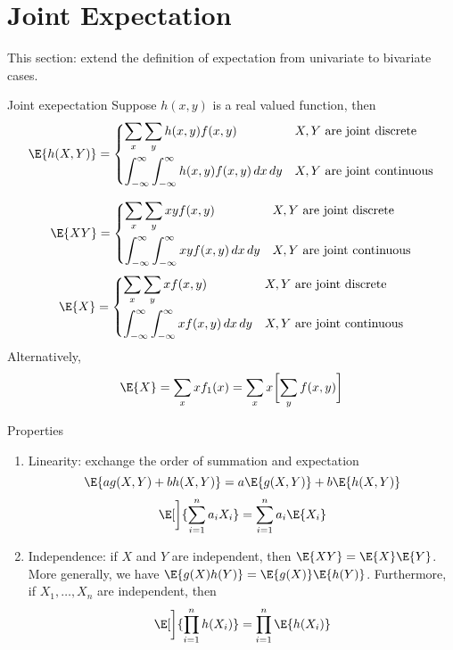 \section{Joint Expectation}
This section: extend the definition of expectation
from univariate to bivariate cases.
\begin{Definition}{Joint exepectation}{}
    Suppose $ h(x,y) $ is a real valued function, then
    \[ \E{h(X,Y)}=\begin{dcases}
            \sum_{x}\sum_{y}h(x,y)f(x,y) & X,Y\text{ are joint discrete}   \\
            \int_{-\infty}^{\infty} \int_{-\infty}^{\infty} h(x,y)f(x,y)\, d{x} \, d{y}
                                         & X,Y\text{ are joint continuous}
        \end{dcases} \]
\end{Definition}
\begin{Example}{}{}
    \[ \E{XY}=\begin{dcases}
            \sum_{x}\sum_{y}xy f(x,y)                                                 & X,Y\text{ are joint discrete}   \\
            \int_{-\infty}^{\infty} \int_{-\infty}^{\infty} x y f(x,y)\, d{x} \, d{y} & X,Y\text{ are joint continuous}
        \end{dcases} \]
    \[ \E{X}=\begin{dcases}
            \sum_{x}\sum_{y}x f(x,y)                                                & X,Y\text{ are joint discrete}   \\
            \int_{-\infty}^{\infty} \int_{-\infty}^{\infty} x f(x,y)\, d{x} \, d{y} & X,Y\text{ are joint continuous}
        \end{dcases} \]
    Alternatively,
    \[ \E{X}=\sum_{x}x f_1(x)=\sum_{x}x\biggl[\sum_{y}f(x,y) \biggr]   \]
\end{Example}
\begin{Theorem}{Properties}{}
    \begin{enumerate}[label=(\arabic*)]
        \item Linearity: exchange the order of summation and expectation
              \[ \E{ag(X,Y)+bh(X,Y)}=a\E{g(X,Y)}+b\E{h(X,Y)} \]
              \[ \E[\bigg]{\sum_{i=1}^{n} a_i X_i}=
                  \sum_{i=1}^{n} a_i \E{X_i} \]
        \item Independence: if $ X $ and $ Y $ are independent,
              then $ \E{XY}=\E{X}\E{Y} $. More generally, we have
              $ \E{g(X)h(Y)}=\E{g(X)}\E{h(Y)} $. Furthermore,
              if $ X_1,\ldots,X_n $ are independent, then
              \[ \E[\bigg]{\prod_{i=1}^n h(X_i)}=
                  \prod_{i=1}^n \E{h(X_i)} \]
    \end{enumerate}
\end{Theorem}
